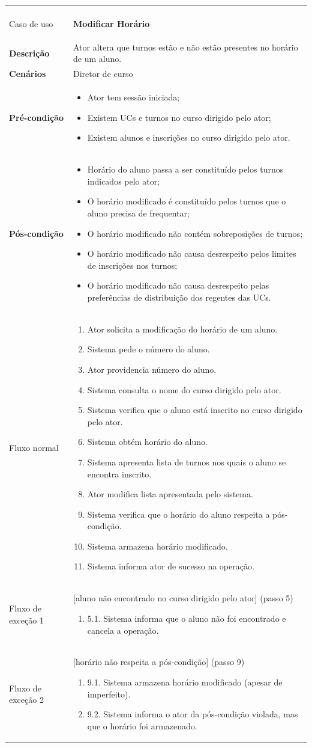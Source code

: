 \documentclass[12pt, a4paper]{article}
\newenvironment{condition}{
    \begin{itemize}[wide=0pt]
        \vspace{-0.2cm}
}{
        \vspace{-0.5cm}
    \end{itemize}
}
\newcommand\flow[1]{
    Fluxo normal &
    \vspace{-0.9cm}
    \singlespacing
    \begin{enumerate}[wide=0pt]
        #1
        \vspace{-0.3cm}
    \end{enumerate} \\ \hline
}
\newcommand\otherflow[3]{
    #1 &
    #2
    \singlespacing
    \begin{enumerate}[wide=0pt]
        #3
        \vspace{-0.3cm}
    \end{enumerate} \\ \hline
}
\newenvironment{usecase}[5]{
    \begin{longtable}{|>{\centering\arraybackslash\bf}m{3cm}|m{13cm}|}
        \multicolumn{2}{c}{\ldots Continua \ldots} \\
        \endfoot
        \endlastfoot

        \hline
        Caso de uso & \textbf{#1} \\

        \hline
        Descrição & #2 \\

        \hline
        Cenários & #3 \\

        \hline
        Pré-condição &
        \vspace{-0.8cm}
        \begin{condition}
            #4
        \end{condition} \\

        \hline
        Pós-condição &
        \vspace{-0.8cm}
        \begin{condition}
            #5
        \end{condition} \\

        \hline
}{
\end{longtable}
}
\begin{document}
\begin{usecase}
    {Modificar Horário}
    {Ator altera que turnos estão e não estão presentes no horário de um aluno.}
    {Diretor de curso}
    {
        \item Ator tem sessão iniciada;
        \item Existem UCs e turnos no curso dirigido pelo ator;
        \item Existem alunos e inscrições no curso dirigido pelo ator.
    }
    {
        \item Horário do aluno passa a ser constituído pelos turnos indicados pelo ator;
        \item O horário modificado é constituído pelos turnos que o aluno precisa de frequentar;
        \item O horário modificado não contém sobreposições de turnos;
        \item O horário modificado não causa desrespeito pelos limites de inscrições nos turnos;
        \item O horário modificado não causa desrespeito pelas preferências de distribuição dos
            regentes das UCs.
    }

    \flow{
        \item Ator solicita a modificação do horário de um aluno.
        \item Sistema pede o número do aluno.
        \item Ator providencia número do aluno.
        \item Sistema consulta o nome do curso dirigido pelo ator.
        \item Sistema verifica que o aluno está inscrito no curso dirigido pelo ator.
        \item Sistema obtém horário do aluno.
        \item Sistema apresenta lista de turnos nos quais o aluno se encontra inscrito.
        \item Ator modifica lista apresentada pelo sistema.
        \item Sistema verifica que o horário do aluno respeita a pós-condição.
        \item Sistema armazena horário modificado.
        \item Sistema informa ator de sucesso na operação.
    }

    \otherflow{Fluxo de exceção 1}{[aluno não encontrado no curso dirigido pelo ator] (passo 5)}{
        \item[5.1.] Sistema informa que o aluno não foi encontrado e cancela a operação.
    }

    \otherflow{Fluxo de exceção 2}{[horário não respeita a pós-condição] (passo 9)}{
        \item[9.1.] Sistema armazena horário modificado (apesar de imperfeito).
        \item[9.2.] Sistema informa o ator da pós-condição violada, mas que o horário foi
            armazenado.
    }
\end{usecase}
\end{document}
